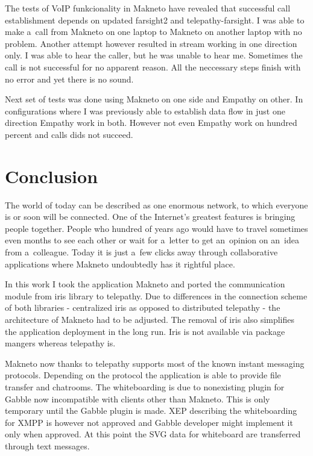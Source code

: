 The tests of VoIP funkcionality in Makneto have revealed that successful call establishment depends on updated farsight2 and telepathy-farsight. I was able to make a~call from Makneto on one laptop to Makneto on another laptop with no problem. Another attempt however resulted in stream working in one direction only. I was able to hear the caller, but he was unable to hear me. Sometimes the call is not successful for no apparent reason. All the neccessary steps finish with no error and yet there is no sound. 

Next set of tests was done using Makneto on one side and Empathy on other. In configurations where I was previously able to establish data flow in just one direction Empathy work in both. However not even Empathy work on hundred percent and calls dids not succeed. 


\chapter{Conclusion}
The world of today can be described as one enormous network, to which everyone is or soon will be connected. One of the Internet's greatest features is bringing people together. People who hundred of years ago would have to travel sometimes even months to see each other or wait for a~letter to get an~opinion on an~idea from a~colleague. Today it is just a~few clicks away through collaborative applications where Makneto undoubtedly has it rightful place.

In this work I took the application Makneto and ported the communication module from iris library to telepathy. Due to differences in the connection scheme of both libraries - centralized iris as opposed to distributed telepathy - the architecture of Makneto had to be adjusted. The removal of iris also simplifies the application deployment in the long run. Iris is not available via package mangers whereas telepathy is. 

Makneto now thanks to telepathy supports most of the known instant messaging protocols. Depending on the protocol the application is able to provide file transfer and chatrooms. The whiteboarding is due to nonexisting plugin for Gabble now incompatible with clients other than Makneto. This is only temporary until the Gabble plugin is made. XEP describing the whiteboarding for XMPP is however not approved and Gabble developer might implement it only when approved. At this point the SVG data for whiteboard are transferred through text messages. 

